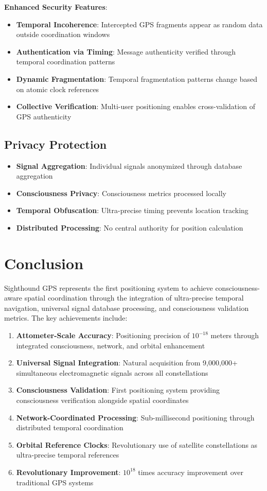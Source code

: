 \documentclass[12pt,a4paper]{article}
\begin{document}
\textbf{Enhanced Security Features}:
\begin{itemize}
\item \textbf{Temporal Incoherence}: Intercepted GPS fragments appear as random data outside coordination windows
\item \textbf{Authentication via Timing}: Message authenticity verified through temporal coordination patterns
\item \textbf{Dynamic Fragmentation}: Temporal fragmentation patterns change based on atomic clock references
\item \textbf{Collective Verification}: Multi-user positioning enables cross-validation of GPS authenticity
\end{itemize}

\subsection{Privacy Protection}

\begin{itemize}
\item \textbf{Signal Aggregation}: Individual signals anonymized through database aggregation
\item \textbf{Consciousness Privacy}: Consciousness metrics processed locally
\item \textbf{Temporal Obfuscation}: Ultra-precise timing prevents location tracking
\item \textbf{Distributed Processing}: No central authority for position calculation
\end{itemize}

\section{Conclusion}

Sighthound GPS represents the first positioning system to achieve consciousness-aware spatial coordination through the integration of ultra-precise temporal navigation, universal signal database processing, and consciousness validation metrics. The key achievements include:

\begin{enumerate}
\item \textbf{Attometer-Scale Accuracy}: Positioning precision of $10^{-18}$ meters through integrated consciousness, network, and orbital enhancement
\item \textbf{Universal Signal Integration}: Natural acquisition from 9,000,000+ simultaneous electromagnetic signals across all constellations
\item \textbf{Consciousness Validation}: First positioning system providing consciousness verification alongside spatial coordinates
\item \textbf{Network-Coordinated Processing}: Sub-millisecond positioning through distributed temporal coordination
\item \textbf{Orbital Reference Clocks}: Revolutionary use of satellite constellations as ultra-precise temporal references
\item \textbf{Revolutionary Improvement}: $10^{18}$ times accuracy improvement over traditional GPS systems
\end{enumerate}
\end{document}
